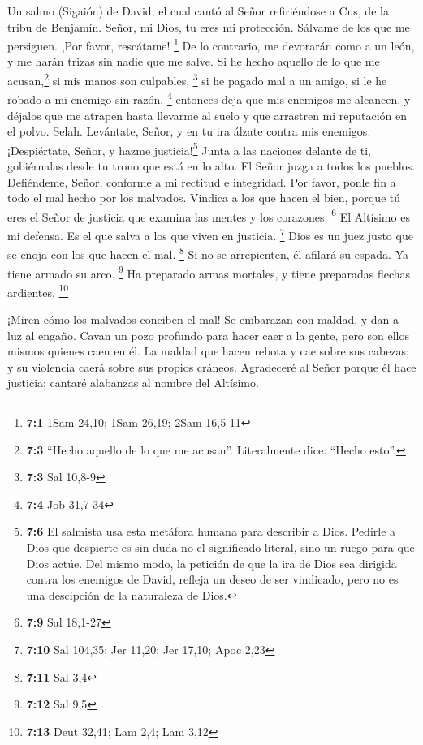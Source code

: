 Un salmo (Sigaión) de David, el cual cantó al Señor refiriéndose a Cus,
de la tribu de Benjamín.  Señor, mi Dios, tu eres mi
protección. Sálvame de los que me persiguen. ¡Por favor, rescátame!
\footnote{\textbf{7:1} 1Sam 24,10; 1Sam 26,19; 2Sam 16,5-11}
 De lo contrario, me devorarán como a un león, y me harán
trizas sin nadie que me salve.  Si he hecho aquello de lo
que me acusan,\footnote{\textbf{7:3} ``Hecho aquello de lo que me
  acusan''. Literalmente dice: ``Hecho esto''.} si mis manos son
culpables, \footnote{\textbf{7:3} Sal 10,8-9}  si he
pagado mal a un amigo, si le he robado a mi enemigo sin razón,
\footnote{\textbf{7:4} Job 31,7-34}  entonces deja que mis
enemigos me alcancen, y déjalos que me atrapen hasta llevarme al suelo y
que arrastren mi reputación en el polvo. Selah. 
Levántate, Señor, y en tu ira álzate contra mis enemigos. ¡Despiértate,
Señor, y hazme justicia!\footnote{\textbf{7:6} El salmista usa esta
  metáfora humana para describir a Dios. Pedirle a Dios que despierte es
  sin duda no el significado literal, sino un ruego para que Dios actúe.
  Del mismo modo, la petición de que la ira de Dios sea dirigida contra
  los enemigos de David, refleja un deseo de ser vindicado, pero no es
  una descipción de la naturaleza de Dios.}  Junta a las
naciones delante de ti, gobiérnalas desde tu trono que está en lo alto.
 El Señor juzga a todos los pueblos. Defiéndeme, Señor,
conforme a mi rectitud e integridad.  Por favor, ponle fin
a todo el mal hecho por los malvados. Vindica a los que hacen el bien,
porque tú eres el Señor de justicia que examina las mentes y los
corazones. \footnote{\textbf{7:9} Sal 18,1-27}  El
Altísimo es mi defensa. Es el que salva a los que viven en justicia.
\footnote{\textbf{7:10} Sal 104,35; Jer 11,20; Jer 17,10; Apoc 2,23}
 Dios es un juez justo que se enoja con los que hacen el
mal. \footnote{\textbf{7:11} Sal 3,4}  Si no se
arrepienten, él afilará su espada. Ya tiene armado su arco. \footnote{\textbf{7:12}
  Sal 9,5}  Ha preparado armas mortales, y tiene
preparadas flechas ardientes. \footnote{\textbf{7:13} Deut 32,41; Lam
  2,4; Lam 3,12}

 ¡Miren cómo los malvados conciben el mal! Se embarazan
con maldad, y dan a luz al engaño.  Cavan un pozo
profundo para hacer caer a la gente, pero son ellos mismos quienes caen
en él.  La maldad que hacen rebota y cae sobre sus
cabezas; y su violencia caerá sobre sus propios cráneos. 
Agradeceré al Señor porque él hace justicia; cantaré alabanzas al nombre
del Altísimo.

